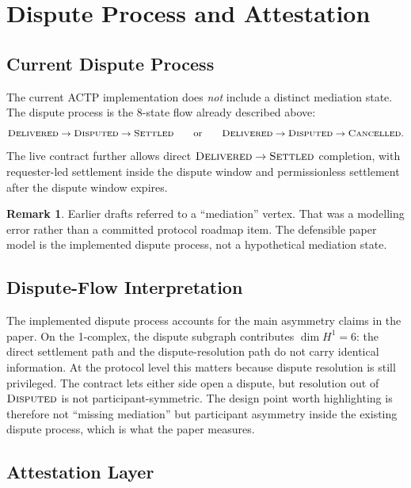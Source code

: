 \documentclass[11pt]{article}
\theoremstyle{plain}
\theoremstyle{definition}
\newtheorem{remark}[theorem]{Remark}
\newcommand{\Hone}{H^{1}}
\newcommand{\dimn}{\operatorname{dim}}
\newcommand{\sDELIV}{\textsc{Delivered}}
\newcommand{\sSETTL}{\textsc{Settled}}
\newcommand{\sDISP}{\textsc{Disputed}}
\newcommand{\sCANC}{\textsc{Cancelled}}
\begin{document}
\section{Dispute Process and Attestation}
\label{sec:evolution}

\subsection{Current Dispute Process}
\label{sec:dispute_process}

The current ACTP implementation does \emph{not} include a distinct mediation
state.  The dispute process is the 8-state flow already described above:
\[
  \sDELIV \to \sDISP \to \sSETTL
  \qquad\text{or}\qquad
  \sDELIV \to \sDISP \to \sCANC.
\]
The live contract further allows direct $\sDELIV \to \sSETTL$ completion,
with requester-led settlement inside the dispute window and permissionless
settlement after the dispute window expires.

\begin{remark}
Earlier drafts referred to a ``mediation'' vertex.  That was a modelling
error rather than a committed protocol roadmap item.  The defensible paper
model is the implemented dispute process, not a hypothetical mediation state.
\end{remark}

\subsection{Dispute-Flow Interpretation}
\label{sec:1complex_compare}

The implemented dispute process accounts for the main asymmetry claims in
the paper.  On the 1-complex, the dispute subgraph contributes
$\dimn\Hone = 6$: the direct settlement path and the dispute-resolution
path do not carry identical information.  At the protocol level this matters
because dispute resolution is still privileged.  The contract lets either
side open a dispute, but resolution out of $\sDISP$ is not
participant-symmetric.  The design point worth highlighting is therefore not
``missing mediation'' but participant asymmetry inside the existing dispute
process, which is what the paper measures.

\subsection{Attestation Layer}
\label{sec:attestation}
\end{document}
